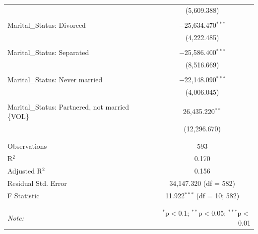 \documentclass[10pt, letterpaper]{article}
\begin{document}
\begin{table}[h!]
\begin{tabular}{@{\extracolsep{5pt}}lc}
                & (5,609.388) \\ 
                & \\ 
                Marital\_Status: Divorced & $-$25,634.470$^{***}$ \\ 
                & (4,222.485) \\ 
                & \\ 
                Marital\_Status: Separated & $-$25,586.400$^{***}$ \\ 
                & (8,516.669) \\ 
                & \\ 
                Marital\_Status: Never married & $-$22,148.090$^{***}$ \\ 
                & (4,006.045) \\ 
                & \\ 
                Marital\_Status: Partnered, not married \{VOL\} & 26,435.220$^{**}$ \\ 
                & (12,296.670) \\ 
                & \\ 
                \hline
                \hline \\[-1ex] 
                Observations & 593 \\ 
                R$^{2}$ & 0.170 \\ 
                Adjusted R$^{2}$ & 0.156 \\ 
                Residual Std. Error & 34,147.320 (df = 582) \\ 
                F Statistic & 11.922$^{***}$ (df = 10; 582) \\ 
                & \\ 
                \hline 
                \hline \\[-1ex] 
                \textit{Note:}  & \multicolumn{1}{r}{$^{*}$p$<$0.1; $^{**}$p$<$0.05; $^{***}$p$<$0.01} \\ 
                \hline
            \end{tabular} 
        \end{table}
\end{document}
